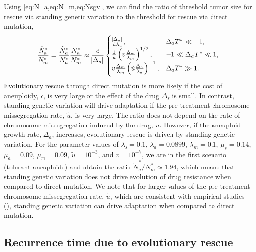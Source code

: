 \documentclass[12pt]{extarticle}
\begin{document}
Using \cref{eq:N_a,eq:N_m,eq:Nsgv}, we can find the ratio of threshold tumor size for rescue via standing genetic variation  to the threshold for rescue via direct mutation,
\begin{equation} \label{eq:N_sgv_ratio}
\frac{\tilde{N}^*_a}{N^*_m}=\frac{\tilde{N}^*_{a}}{N^*_{a}} \frac{N^*_a}{N^*_m} \approx \frac{c}{\abs{\Delta_s}}\begin{cases}
    \frac{\abs{\Delta_a}}{\tilde{u}\lambda_a} ,&
  \Delta_a T^* \ll -1 ,\\ 
  \frac{1}{\tilde{u}}\left(v \frac{\Delta_m}{\lambda_m}\right)^{1/2} ,&
  -1 \ll \Delta_a T^* \ll 1  ,\\ 
  v \frac{\Delta_m}{\lambda_m} \left(\tilde{u}\frac{\Delta_a}{\lambda_a}\right)^{-1}  ,&
   \Delta_a T^* \gg 1 .
  \end{cases}
\end{equation}
Evolutionary rescue through direct mutation is more likely if the cost of aneuploidy, $c$, is very large or the effect of the drug $\Delta_s$ is small. In contrast, standing genetic variation will drive adaptation if the pre-treatment chromosome missegregation rate, $\tilde{u}$, is very large. The ratio does not depend on the rate of chromosome missegregation induced by the drug, $u$. However, if the aneuploid growth rate, $\Delta_a$, increases, evolutionary rescue is driven by standing genetic variation. For the parameter values of  $\lambda_s=0.1$, $\lambda_a=0.0899$, $\lambda_m=0.1$, $\mu_s=0.14$, $\mu_a=0.09$, $\mu_m=0.09$, $\tilde{u}=10^{-3}$, and $v=10^{-7}$, we are in the first scenario (tolerant aneuploids) and obtain the ratio $\tilde{N}^*_a/N^*_m \approx 1.94$, which means that standing genetic variation does not drive evolution of drug resistance when compared to direct mutation. We note that for larger values of the pre-treatment chromosome missegregation rate, $\tilde{u}$, which are consistent with empirical studies (), standing genetic variation can drive adaptation when compared to direct mutation.


\subsection*{Recurrence time due to evolutionary rescue}
\end{document}
